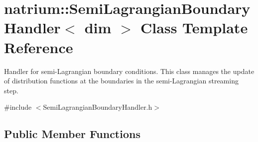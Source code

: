 \hypertarget{classnatrium_1_1SemiLagrangianBoundaryHandler}{
\section{natrium::SemiLagrangianBoundaryHandler$<$ dim $>$ Class Template Reference}
\label{classnatrium_1_1SemiLagrangianBoundaryHandler}
}


Handler for semi-\/Lagrangian boundary conditions. This class manages the update of distribution functions at the boundaries in the semi-\/Lagrangian streaming step.  


{\ttfamily \#include $<$SemiLagrangianBoundaryHandler.h$>$}\subsection*{Public Member Functions}
